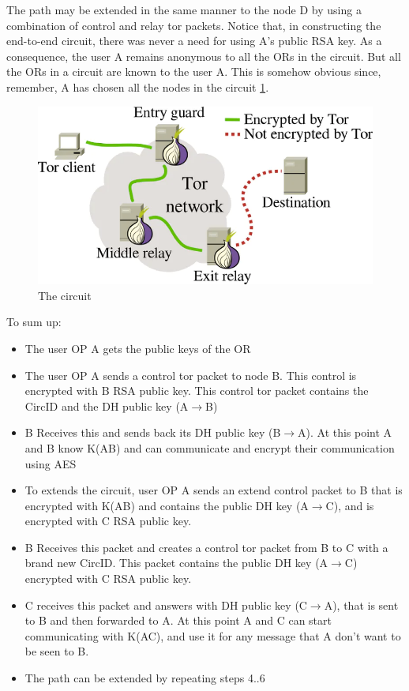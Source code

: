 The path may be extended in the same manner to the node D by using a combination of control and relay tor packets. Notice that, in constructing the end-to-end circuit, there was never a need for using A's public RSA key. As a consequence, the user A remains anonymous to all the ORs in the circuit. But all the ORs in a circuit are known to the user A. This is somehow obvious since, remember, A has chosen all the nodes in the circuit \ref{fig:tor1}.

\begin{figure}
	\centering
	\includegraphics[width=0.7\linewidth]{Images/Chapter7/tor1}
	\caption{The circuit}
	\label{fig:tor1}
\end{figure}
To sum up:
\begin{itemize}
	\item [1.] The user OP A gets the public keys of the OR
	\item [2.] The user OP A sends a control tor packet to node B. This control is encrypted with B RSA public key. This control tor packet contains the CircID and the DH public key (A$\rightarrow$B)
	\item [3.] B Receives this and sends back its DH public key (B$\rightarrow$A). At this point A and B know K(AB) and can communicate and encrypt their communication using AES
	\item [4.] To extends the circuit, user OP A sends an extend control packet to B that is encrypted with K(AB) and contains the public DH key (A$\rightarrow$C), and is encrypted with C RSA public key.
	\item [5.] B Receives this packet and creates a control tor packet from B to C with a brand new CircID. This packet contains the public DH key (A$\rightarrow$C) encrypted with C RSA public key.
	\item [6.] C receives this packet and answers with DH public key (C$\rightarrow$A), that is sent to B and then forwarded  to A. At this point A and C can start communicating with K(AC), and use it for any message that A don't want to be seen to B.
	\item [7.] The path can be extended by repeating steps 4..6
	
	
	
\end{itemize}
